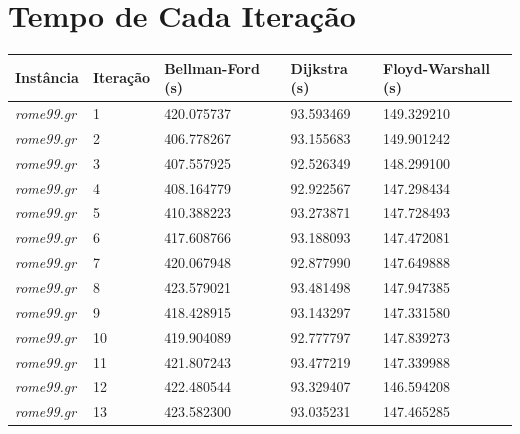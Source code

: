 \documentclass[12pt]{article}
\begin{document}
\section{Tempo de Cada Iteração}
\begin{longtable}{l|l|lll}
    \hline
    \textbf{Instância} & \textbf{Iteração} & \textbf{Bellman-Ford (s)} & \textbf{Dijkstra (s)} & \textbf{Floyd-Warshall (s)} \\ \hline
\textit{rome99.gr}               &  1        & 420.075737             & 93.593469            & 149.329210                   \\
\textit{rome99.gr}               &  2        & 406.778267             & 93.155683            & 149.901242                   \\
\textit{rome99.gr}               &  3        & 407.557925             & 92.526349            & 148.299100                   \\
\textit{rome99.gr}               &  4        & 408.164779             & 92.922567            & 147.298434                   \\
\textit{rome99.gr}               &  5        & 410.388223             & 93.273871            & 147.728493                   \\
\textit{rome99.gr}               &  6        & 417.608766             & 93.188093            & 147.472081                   \\
\textit{rome99.gr}               &  7        & 420.067948             & 92.877990            & 147.649888                   \\
\textit{rome99.gr}               &  8        & 423.579021             & 93.481498            & 147.947385                   \\
\textit{rome99.gr}               &  9        & 418.428915             & 93.143297            & 147.331580                   \\
\textit{rome99.gr}               &  10       & 419.904089             & 92.777797            & 147.839273                   \\
\textit{rome99.gr}               &  11       & 421.807243             & 93.477219            & 147.339988                   \\
\textit{rome99.gr}               &  12       & 422.480544             & 93.329407            & 146.594208                   \\
\textit{rome99.gr}               &  13       & 423.582300             & 93.035231            & 147.465285                   \\

\end{longtable}
\end{document}
